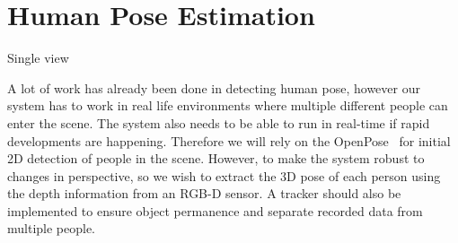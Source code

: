 \section{Human Pose Estimation}

Single view

A lot of work has already been done in detecting human pose, however our system has to work in real life environments where multiple different people can enter the scene. The system also needs to be able to run in real-time if rapid developments are happening. Therefore we will rely on the OpenPose~\cite{cao2017realtime} for initial 2D detection of people in the scene. However, to make the system robust to changes in perspective, so we wish to extract the 3D pose of each person using the depth information from an RGB-D sensor.
A tracker should also be implemented to ensure object permanence and separate recorded data from multiple people.

